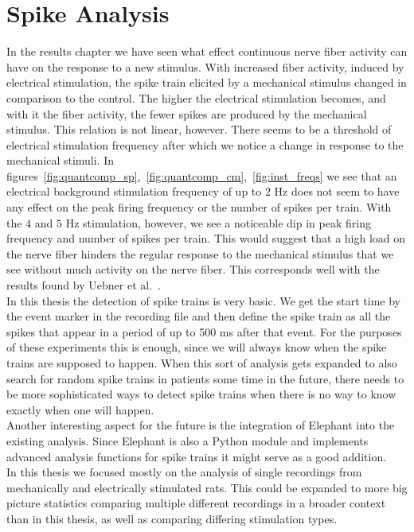 \section{Spike Analysis}
In the results chapter we have seen what effect continuous nerve fiber activity can have on the response to a new stimulus. With increased fiber activity, induced by electrical stimulation, the spike train elicited by a mechanical stimulus changed in comparison to the control. The higher the electrical stimulation becomes, and with it the fiber activity, the fewer spikes are produced by the mechanical stimulus. This relation is not linear, however. There seems to be a threshold of electrical stimulation frequency after which we notice a change in response to the mechanical stimuli. In figures~\ref{fig:quantcomp_sp},~\ref{fig:quantcomp_cm},~\ref{fig:inst_freqs} we see that an electrical background stimulation frequency of up to $2$ Hz does not seem to have any effect on the peak firing frequency or the number of spikes per train. With the $4$ and $5$ Hz stimulation, however, we see a noticeable dip in peak firing frequency and number of spikes per train. This would suggest that a high load on the nerve fiber hinders the regular response to the mechanical stimulus that we see without much activity on the nerve fiber. This corresponds well with the results found by Uebner et al.~\cite{roberto}.\\
In this thesis the detection of spike trains is very basic. We get the start time by the event marker in the recording file and then define the spike train as all the spikes that appear in a period of up to 500 ms after that event. For the purposes of these experiments this is enough, since we will always know when the spike trains are supposed to happen. When this sort of analysis gets expanded to also search for random spike trains in patients some time in the future, there needs to be more sophisticated ways to detect spike trains when there is no way to know exactly when one will happen.\\
Another interesting aspect for the future is the integration of Elephant into the existing analysis. Since Elephant is also a Python module and implements advanced analysis functions for spike trains it might serve as a good addition. \\
In this thesis we focused mostly on the analysis of single recordings from mechanically and electrically stimulated rats. This could be expanded to more big picture statistics comparing multiple different recordings in a broader context than in this thesis, as well as comparing differing stimulation types. \\





\cleardoublepage
